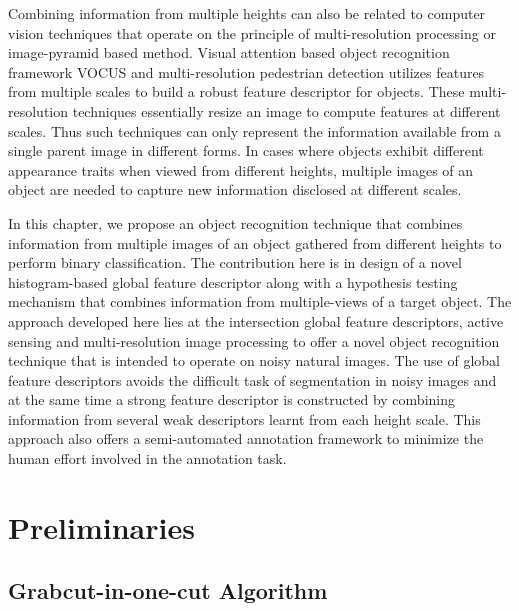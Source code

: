 \documentclass {udthesis}
\begin{document}
Combining information from multiple heights can also be related to computer vision techniques that operate on the principle of multi-resolution processing or image-pyramid based method. Visual attention based object recognition framework VOCUS \cite{frintrop} and multi-resolution pedestrian detection \cite{park} utilizes features from multiple scales to build a robust feature descriptor for objects. These multi-resolution techniques essentially resize an image to compute features at different scales. Thus such techniques can only represent the information available from a single parent image in different forms. In cases where objects exhibit different appearance traits when viewed from different heights, multiple images of an object are needed to capture new information disclosed at different scales.

In this chapter, we propose an object recognition technique that combines information from multiple images of an object gathered from different heights to perform binary classification. The contribution here is in design of a novel histogram-based global feature descriptor along with a hypothesis testing mechanism that combines information from multiple-views of a target object. The approach developed here lies at the intersection global feature descriptors, active sensing and multi-resolution image processing to offer a novel object recognition technique that is intended to operate on noisy natural images. The use of global feature descriptors avoids the difficult task of segmentation in noisy images and at the same time a strong feature descriptor is constructed by combining information from several weak descriptors learnt from each height scale. This approach also offers a semi-automated annotation framework to minimize the human effort involved in the annotation task.

\section{Preliminaries}

\subsection{Grabcut-in-one-cut Algorithm}
\label{sec:onecut}
\end{document}
